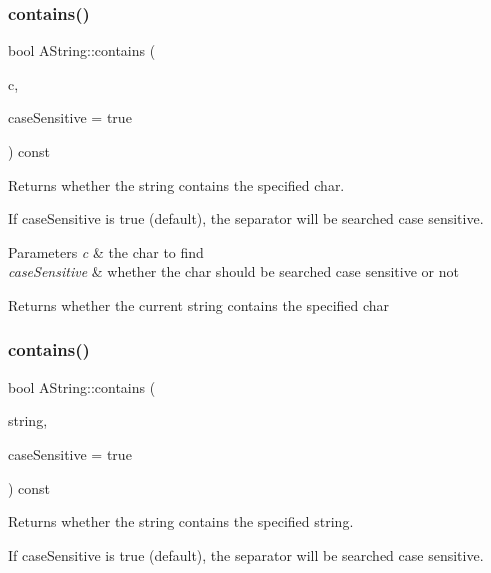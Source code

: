 \subsubsection{\texorpdfstring{contains()}{contains()}\hspace{0.1cm}{\footnotesize\ttfamily [1/2]}}
{\footnotesize\ttfamily bool A\+String\+::contains (\begin{DoxyParamCaption}\item[{char}]{c,  }\item[{bool}]{case\+Sensitive = {\ttfamily true} }\end{DoxyParamCaption}) const}



Returns whether the string contains the specified char. 

If case\+Sensitive is true (default), the separator will be searched case sensitive.


\begin{DoxyParams}{Parameters}
{\em c} & the char to find \\
\hline
{\em case\+Sensitive} & whether the char should be searched case sensitive or not \\
\hline
\end{DoxyParams}
\begin{DoxyReturn}{Returns}
whether the current string contains the specified char 
\end{DoxyReturn}
\mbox{\label{class_a_string_abe6a9966ef157e0584c279377b6c9987}} 
\subsubsection{\texorpdfstring{contains()}{contains()}\hspace{0.1cm}{\footnotesize\ttfamily [2/2]}}
{\footnotesize\ttfamily bool A\+String\+::contains (\begin{DoxyParamCaption}\item[{const \mbox{\hyperlink{class_a_string}{A\+String}} \&}]{string,  }\item[{bool}]{case\+Sensitive = {\ttfamily true} }\end{DoxyParamCaption}) const}



Returns whether the string contains the specified string. 

If case\+Sensitive is true (default), the separator will be searched case sensitive.


